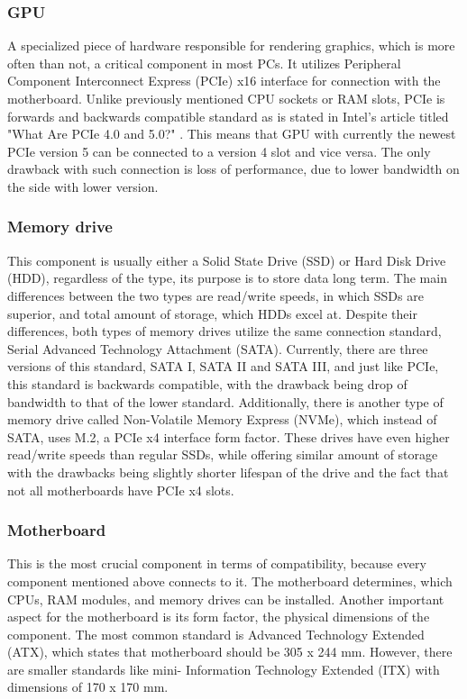 \subsubsection{GPU}
A specialized piece of hardware responsible for rendering graphics, which is more often than not, a critical component in most PCs.
It utilizes Peripheral Component Interconnect Express (PCIe) x16 interface for connection with the motherboard.
Unlike previously mentioned CPU sockets or RAM slots, PCIe is forwards and backwards compatible standard as is stated in Intel's article titled "What Are PCIe 4.0 and 5.0?" \cite{noauthor_what_nodate}.
This means that GPU with currently the newest PCIe version 5 can be connected to a version 4 slot and vice versa.
The only drawback with such connection is loss of performance, due to lower bandwidth on the side with lower version.

\subsubsection{Memory drive}
This component is usually either a Solid State Drive (SSD) or Hard Disk Drive (HDD), regardless of the type, its purpose is to store data long term.
The main differences between the two types are read/write speeds, in which SSDs are superior, and total amount of storage, which HDDs excel at.
Despite their differences, both types of memory drives utilize the same connection standard, Serial Advanced Technology Attachment (SATA).
Currently, there are three versions of this standard, SATA I, SATA II and SATA III, and just like PCIe, this standard is backwards compatible, with the drawback being drop of bandwidth to that of the lower standard. \cite{noauthor_what_2023}
Additionally, there is another type of memory drive called Non-Volatile Memory Express (NVMe), which instead of SATA, uses M.2, a PCIe x4 interface form factor.
These drives have even higher read/write speeds than regular SSDs, while offering similar amount of storage with the drawbacks being slightly shorter lifespan of the drive and the fact that not all motherboards have PCIe x4 slots.

\subsubsection{Motherboard}
This is the most crucial component in terms of compatibility, because every component mentioned above connects to it.
The motherboard determines, which CPUs, RAM modules, and memory drives can be installed.
Another important aspect for the motherboard is its form factor, the physical dimensions of the component.
The most common standard is Advanced Technology Extended (ATX), which states that motherboard should be 305 x 244 mm.
However, there are smaller standards like mini- Information Technology Extended (ITX) with dimensions of 170 x 170 mm.

